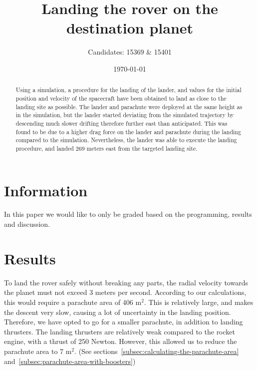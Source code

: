 \documentclass[reprint,english,notitlepage]{revtex4-2}
\begin{document}
\title{Landing the rover on the destination planet}
\author{Candidates: 15369 \& 15401}
\date{\today}

\begin{abstract}
    Using a simulation, a procedure for the landing of the lander, and values for the initial position and velocity of the spacecraft have been obtained to land as close to the landing site as possible.
    The lander and parachute were deployed at the same height as in the simulation, but the lander started deviating from the simulated trajectory by descending much slower drifting therefore further east than anticipated.
    This was found to be due to a higher drag force on the lander and parachute during the landing compared to the simulation.
    Nevertheless, the lander was able to execute the landing procedure, and landed 269 meters east from the targeted landing site.
\end{abstract}

\maketitle

\onecolumngrid
\section{Information} \label{sec:info}
\begin{center}
    In this paper we would like to only be graded based on the programming, results and discussion.
\end{center}
\vspace{20}
\twocolumngrid

\section{Results} \label{sec:results}
    To land the rover safely without breaking any parts, the radial velocity towards the planet must not exceed 3 meters per second.
    According to our calculations, this would require a parachute area of 406 m$^2$.
    This is relatively large, and makes the descent very slow, causing a lot of uncertainty in the landing position.\\
    Therefore, we have opted to go for a smaller parachute, in addition to landing thrusters.
    The landing thrusters are relatively weak compared to the rocket engine, with a thrust of 250 Newton.
    However, this allowed us to reduce the parachute area to 7 m$^2$. (See sections~\ref{subsec:calculating-the-parachute-area} and~\ref{subsec:parachute-area-with-boosters})
\end{document}
